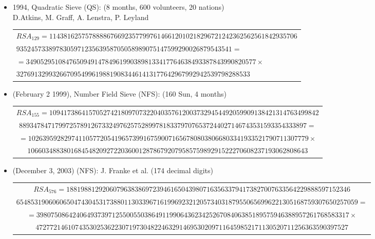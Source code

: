 \documentclass[landscape,handout]{powersem} %
\newcommand{\heading}[1]{%
 \begin{center}
  \large\bf
  \shadowbox{{\textcolor{conceptcolor}{#1}}}%
 \end{center}
 \vspace{1ex minus 1ex}}
\begin{document}
\begin{slide}
\heading{Contemporary Factoring}\vspace{-3mm}\pause

\begin{itemize}
  \item[\textcolor{blue}{\ding{182}}] 1994, Quadratic Sieve (QS): (8 months, 600 volunteers, 20 nations)\\
  D.Atkins, M. Graff, A. Lenstra, P. Leyland
\begin{tiny}\begin{tabular}{l}
$  RSA_{129} = 114381625757888867669235779976146612010218296721242362562561842935706$\\
\hspace*{5mm}$935245733897830597123563958705058989075147599290026879543541=$\\
$        = 3490529510847650949147849619903898133417764638493387843990820577 \times$\\
$
32769132993266709549961988190834461413177642967992942539798288533
$\end{tabular}\end{tiny}\pause

  \item[\textcolor{blue}{\ding{183}}] (February 2 1999), Number Field Sieve (NFS): (160 Sun, 4 months)
 \begin{tiny}\begin{tabular}{c}
\hspace*{-1cm}$ RSA_{155} = 109417386415705274218097073220403576120037329454492059909138421314763499842$\\
$88934784717997257891267332497625752899781833797076537244027146743531593354333897=$\\
$=102639592829741105772054196573991675900716567808038066803341933521790711307779
\times$\\
$106603488380168454820927220360012878679207958575989291522270608237193062808643
$\end{tabular}\end{tiny}\pause

  \item[\textcolor{blue}{\ding{184}}] (December 3, 2003) (NFS): J. Franke et al. (174 decimal digits)
 \begin{tiny}\begin{tabular}{c}
\hspace*{-1cm}$ RSA_{576} = 1881988129206079638386972394616504398071635633794173827007633564229888597152346$\\
$65485319060606504743045317388011303396716199692321205734031879550656996221305168759307650257059=$\\
$=398075086424064937397125500550386491199064362342526708406385189575946388957261768583317\times$\\
$472772146107435302536223071973048224632914695302097116459852171130520711256363590397527
$\end{tabular}\end{tiny}\pause


\end{itemize}
\end{slide}
\end{document}
